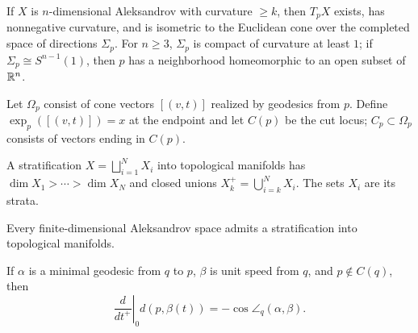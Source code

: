 \begin{theorem}
\label{thm:chow-iii-g49-tangent-cone}
If $X$ is $n$-dimensional Aleksandrov with curvature $\geq k$, then $T_pX$
exists, has nonnegative curvature, and is isometric to the Euclidean cone over
the completed space of directions $\Sigma_p$.  For $n\geq3$, $\Sigma_p$ is
compact of curvature at least $1$; if $\Sigma_p\cong S^{n-1}(1)$, then $p$ has
a neighborhood homeomorphic to an open subset of $\mathbb R^n$.
\end{theorem}

\begin{definition}
\label{def:chow-iii-g50-exponential-cut-locus}
Let $\Omega_p$ consist of cone vectors $[(v,t)]$ realized by geodesics from
$p$.  Define $\exp_p([(v,t)])=x$ at the endpoint and let $C(p)$ be the cut
locus; $C_p\subset\Omega_p$ consists of vectors ending in $C(p)$.
\end{definition}

\begin{definition}[Stratification]
\label{def:chow-iii-g51-stratification}
A stratification $X=\bigsqcup_{i=1}^N X_i$ into topological manifolds has
$\dim X_1>\cdots>\dim X_N$ and closed unions
$X_k^+=\bigcup_{i=k}^N X_i$.  The sets $X_i$ are its strata.
\end{definition}

\begin{theorem}
\label{thm:chow-iii-g52-aleksandrov-stratification}
Every finite-dimensional Aleksandrov space admits a stratification into
topological manifolds.
\end{theorem}

\begin{lemma}
\label{lem:chow-iii-g53-distance-derivative}
If $\alpha$ is a minimal geodesic from $q$ to $p$, $\beta$ is unit speed from
$q$, and $p\notin C(q)$, then
\[
\left.\frac{d}{dt^+}\right|_{0}d(p,\beta(t))=-\cos\angle_q(\alpha,\beta).
\]
\end{lemma}

